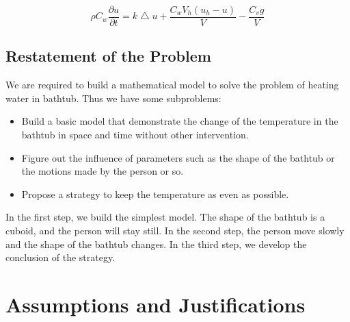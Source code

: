 \documentclass[12pt,a4paper,titlepage]{article}
\begin{document}
\begin{displaymath}
\rho C_{w}\frac{\partial u}{\partial t}=k\bigtriangleup u+\frac{C_w V_h(u_h-u)}{V}-\frac{C_v g}{V}
\end{displaymath}

\subsection{Restatement of the Problem}
\label{sec:restatement-of-the-problem}
We are required to build a mathematical model to solve the problem of heating water in bathtub. Thus we have some subproblems:
\begin{itemize}
\item Build a basic model that demonstrate the change of the temperature in the bathtub in space and time without other intervention.
\item Figure out the influence of parameters such as the shape of the bathtub or the motions made by the person or so.
\item Propose a strategy to keep the temperature as even as possible.
\end{itemize}
In the first step, we build the simplest model. The shape of the bathtub is a cuboid, and the person will stay still. In the second step, the person move slowly and the shape of the bathtub changes. In the third step, we develop the conclusion of the  strategy.


\section{Assumptions and Justifications}
\label{sec:assumptions-and-justifications}
\end{document}

